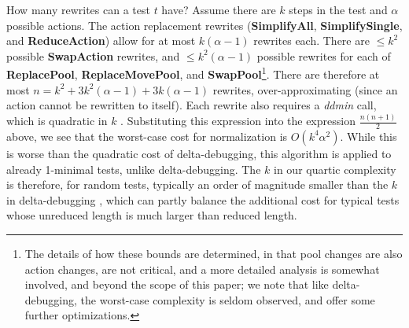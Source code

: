 How many rewrites can a test $t$ have?  Assume there are $k$
steps in the test and $\alpha$ possible actions.  The action
replacement rewrites ({\bf SimplifyAll}, {\bf SimplifySingle}, and
{\bf ReduceAction}) allow for at most $k (\alpha-1)$ rewrites each.  There
are $\leq k^2$ possible {\bf SwapAction} rewrites, and $\leq k^2(\alpha-1)$
possible rewrites for each of {\bf ReplacePool}, {\bf
  ReplaceMovePool}, and {\bf SwapPool}\footnote{The details of how
  these bounds are determined, in that pool changes are also action
  changes, are not critical, and a more detailed analysis is somewhat
  involved, and beyond the scope of this paper; we note that like
  delta-debugging, the worst-case complexity is seldom observed, and
  offer some further optimizations.}.  There are therefore at
most $n=k^2 + 3k^2(\alpha-1) + 3k(\alpha-1)$ rewrites, over-approximating (since
an action cannot be rewritten to itself).  Each rewrite also
requires a \emph{ddmin} call, which is quadratic in $k$ \cite{DD}.
Substituting this expression into the expression $\frac{n(n+1)}{2}$
above, we see that the worst-case cost for normalization is
$O(k^4\alpha^2)$.  While this is
worse than the quadratic cost of delta-debugging, this algorithm is
applied to already 1-minimal tests, unlike delta-debugging. The $k$ in our quartic complexity
is therefore, for random tests, typically an order of magnitude smaller
than the $k$ in delta-debugging \cite{ICSEDiff,icst2014,MinUnit},
which can partly balance the additional cost for typical tests whose
unreduced length is much larger than reduced length.


